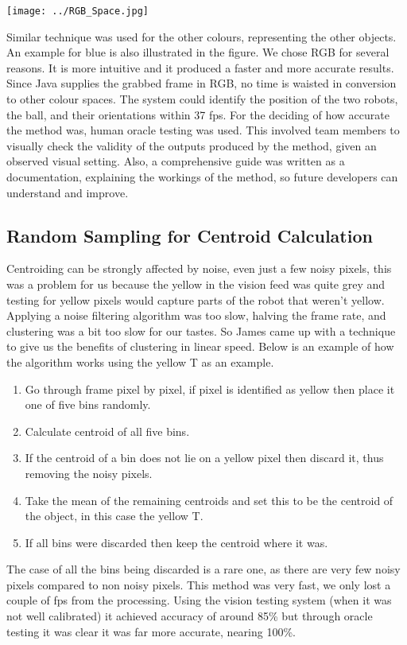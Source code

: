 \texttt{[image: ../RGB\_Space.jpg]} 

Similar technique was used for the other colours, representing the other objects. An example for blue is also illustrated in the figure. We chose RGB for several reasons. It is more intuitive and it produced a faster and more accurate results. Since Java supplies the grabbed frame in RGB, no time is waisted in conversion to other colour spaces. The system could identify the position of the two robots, the ball, and their orientations within 37 fps. For the deciding of how accurate the method was, human oracle testing was used. This involved team members to visually check the validity of the outputs produced by the method, given an observed visual setting. Also, a comprehensive guide was written as a documentation, explaining the workings of the method, so future developers can understand and improve. 

\subsection{Random Sampling for Centroid Calculation}

Centroiding can be strongly affected by noise, even just a few noisy pixels, this was a problem for us because the yellow in the vision feed was quite grey and testing for yellow pixels would capture parts of the robot that weren't yellow.  Applying a noise filtering algorithm was too slow, halving the frame rate, and clustering was a bit too slow for our tastes.  So James came up with a technique to give us the benefits of clustering in linear speed.  Below is an example of how the algorithm works using the yellow T as an example.
\begin{enumerate}
\item Go through frame pixel by pixel, if pixel is identified as yellow then place it one of five bins randomly.
\item Calculate centroid of all five bins.
\item If the centroid of a bin does not lie on a yellow pixel then discard it, thus removing the noisy pixels.
\item Take the mean of the remaining centroids and set this to be the centroid of the object, in this case the yellow T.
\item If all bins were discarded then keep the centroid where it was.
\end{enumerate}

The case of all the bins being discarded is a rare one, as there are very few noisy pixels compared to non noisy pixels.  This method was very fast, we only lost a couple of fps from the processing.  Using the vision testing system (when it was not well calibrated) it achieved accuracy of around 85\% but through oracle testing it was clear it was far more accurate, nearing 100\%.

